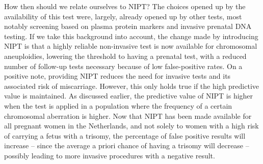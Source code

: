 How then should we relate ourselves to NIPT? The choices opened up by the availability of this test were, largely, already opened up by other tests, most notably screening based on plasma protein markers and invasive prenatal DNA testing. 
If we take this background into account, the change made by introducing NIPT is that a highly reliable non-invasive test is now available for chromosomal aneuploidies, lowering the threshold to having a prenatal test, with a reduced number of follow-up tests necessary because of low false-positive rates. 
On a positive note, providing NIPT reduces the need for invasive tests and its associated risk of miscarriage. However, this only holds true if the high predictive value is maintained. 
As discussed earlier, the predictive value of NIPT is higher when the test is applied in a population where the frequency of a certain chromosomal aberration is higher. 
Now that NIPT has been made available for all pregnant women in the Netherlands, and not solely to women with a high risk of carrying a fetus with a trisomy, the percentage of false positive results will increase – since the average a priori chance of having a trisomy will decrease – possibly leading to more invasive procedures with a negative result.

